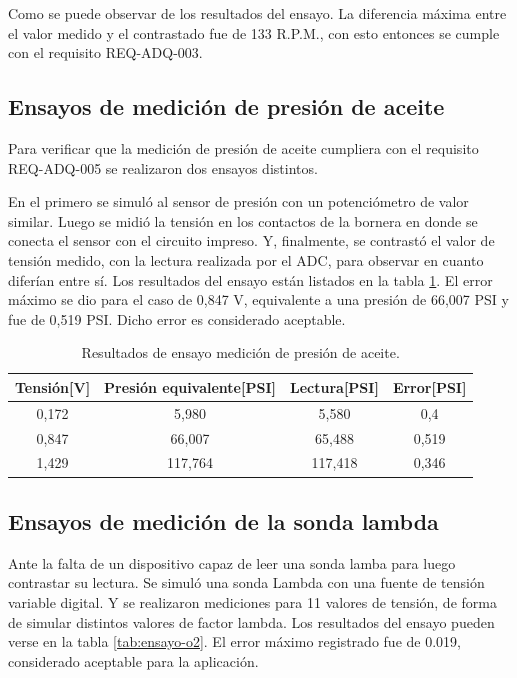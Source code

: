 Como se puede observar de los resultados del ensayo. La diferencia máxima entre el valor medido y el contrastado fue de 133 R.P.M., con esto entonces se cumple con el requisito REQ-ADQ-003.

\break

\subsection{Ensayos de medición de presión de aceite}

Para verificar que la medición de presión de aceite cumpliera con el requisito REQ-ADQ-005 se realizaron dos ensayos distintos.

En el primero se simuló al sensor de presión con un potenciómetro de valor similar. Luego se midió la tensión en los contactos de la bornera en donde se conecta el sensor con el circuito impreso. Y, finalmente, se contrastó el valor de tensión medido, con la lectura realizada por el ADC, para observar en cuanto diferían entre sí. Los resultados del ensayo están listados en la tabla \ref{tab:ensayo-presion}. El error máximo se dio para el caso de 0,847 V, equivalente a una presión de 66,007 PSI y fue de 0,519 PSI. Dicho error es considerado aceptable. 

\begin{table}[htpb]
	\centering
	\caption{Resultados de ensayo medición de presión de aceite.}
	\centering
	\begin{tabular}{c c c c}    
		\toprule
		\textbf{Tensión[V]} & \textbf{Presión equivalente[PSI]} & \textbf{Lectura[PSI]} & \textbf{Error[PSI]}\\
		\midrule
		0,172		&   5,980 & 5,580 & 0,4 \\
		0,847		&   66,007 & 65,488 & 0,519 \\
		1,429		&   117,764 & 117,418 & 0,346 \\
		\bottomrule
	\end{tabular}
	\label{tab:ensayo-presion}
\end{table}

\subsection{Ensayos de medición de la sonda lambda}

Ante la falta de un dispositivo capaz de leer una sonda lamba para luego contrastar su lectura. Se simuló una sonda Lambda con una fuente de tensión variable digital. Y se realizaron mediciones para 11 valores de tensión, de forma de simular distintos valores de factor lambda. Los resultados del ensayo pueden verse en la tabla \ref{tab:ensayo-o2}. El error máximo registrado fue de 0.019, considerado aceptable para la aplicación.

